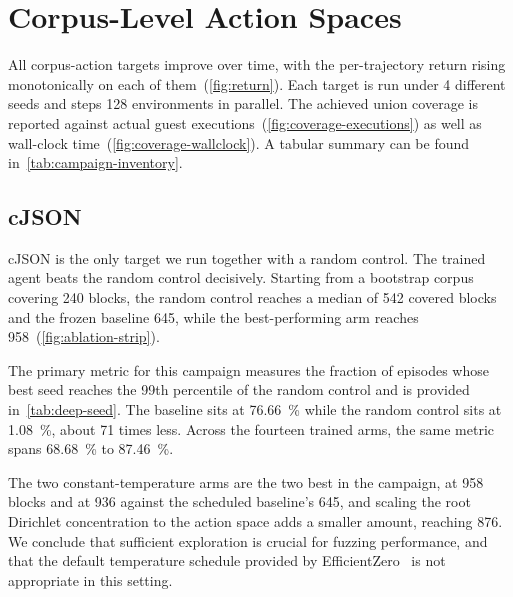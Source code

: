 
\section{Corpus-Level Action Spaces}\label{sec:results-corpus-actions}

All corpus-action targets improve over time, with the per-trajectory return rising
monotonically on each of them~(\cref{fig:return}).
Each target is run under 4 different seeds and steps 128 environments in parallel.
The achieved union coverage is reported against actual guest
executions~(\cref{fig:coverage-executions}) as well as wall-clock
time~(\cref{fig:coverage-wallclock}).
A tabular summary can be found in~\cref{tab:campaign-inventory}.







\subsection{cJSON}\label{sec:results-cjson}

cJSON is the only target we run together with a random control.
The trained agent beats the random control decisively.
Starting from a bootstrap corpus covering \num{240} blocks, the random control reaches a
median of \num{542} covered blocks and the frozen baseline \num{645}, while the best-performing
arm reaches \num{958}~(\cref{fig:ablation-strip}).



The primary metric for this campaign measures the fraction of episodes whose
best seed reaches the 99th percentile of the random control and is provided in~\cref{tab:deep-seed}.
The baseline sits at \SI{76.66}{\percent} while the random control sits at \SI{1.08}{\percent}, about 71 times less.
Across the fourteen trained arms, the same metric spans \SI{68.68}{\percent} to
\SI{87.46}{\percent}.




The two constant-temperature arms are the two best in the campaign,  at \num{958} blocks
and  at \num{936} against the scheduled baseline's \num{645}, and scaling the root
Dirichlet concentration to the action space adds a smaller amount,  reaching
\num{876}.
We conclude that sufficient exploration is crucial for fuzzing performance, and that the
default temperature schedule provided by EfficientZero~\cite{ye_mastering_2021} is
not appropriate in this setting.

